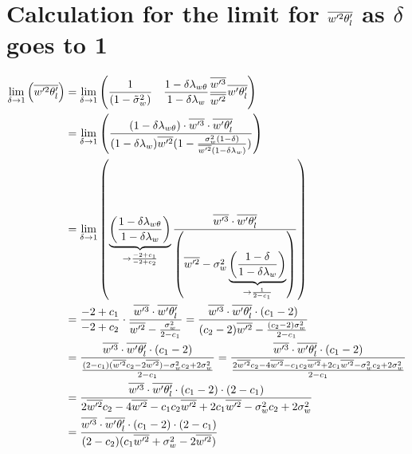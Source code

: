 \section{Calculation for the limit for \texorpdfstring{$\overline{w'^2 \theta_l'}$}{wprime2thetalprimebar} as \texorpdfstring{$\delta$}{delta} goes to 1}
\label{sec:calculation-for-the-limit-for-wprime2thetalprimebar-as-delta-goes-to-1}

\begin{align}
    \label{eq:limit_wprime2thetalbar_delta_to_1_calc}
    \lim_{\delta \to 1}\left(\overline{w'^2 \theta_l'}\right)
    &= \lim_{\delta \to 1}\left(
    \frac{1}{\left( 1 - \tilde{\sigma}_w^2 \right)}
    \quad
    \frac{1 - \delta \lambda_{w\theta}}{1-\delta \lambda_w}
    \frac{\overline{w'^3}}{\overline{w'^2}} \overline{w'\theta_l'}
    \right)
    \\
    &= \lim_{\delta \to 1}\left(
    \frac{(1 - \delta \lambda_{w\theta}) \cdot \overline{w'^3} \cdot \overline{w'\theta_l'}}
    {(1-\delta \lambda_w)\overline{w'^2} (1-\frac{\sigma_w^2 (1-\delta)}{\overline{w'^2} (1-\delta\lambda_w)})}
    \right)
    \\
    &= \lim_{\delta \to 1}\left(
    \underbrace{\left(\frac{1 - \delta \lambda_{w\theta}}{1 - \delta\lambda_w}\right)}_{\to \frac{-2 + c_1}{-2 + c_2}}
    \frac{\overline{w'^3} \cdot \overline{w'\theta_l'}}
    {\left(\overline{w'^2} - \sigma_w^2 \underbrace{\left(\frac{1-\delta}{1-\delta\lambda_w}\right)}_{\to \frac{1}{2 - c_1}}\right)}
    \right)
    \\
    &= \frac{-2 + c_1}{-2 + c_2} \cdot
    \frac{\overline{w'^3} \cdot \overline{w'\theta_l'}}
    {\overline{w'^2} - \frac{\sigma_w^2}{2 - c_1}}
    = \frac{\overline{w'^3} \cdot \overline{w'\theta_l'} \cdot (c_1 - 2)}
    {(c_2 - 2)\overline{w'^2} - \frac{(c_2 - 2)\sigma_w^2}{2 - c_1}} \\
    &= \frac{\overline{w'^3} \cdot \overline{w'\theta_l'} \cdot (c_1 - 2)}
    {\frac{(2 - c_1) (\overline{w'^2} c_2 - 2\overline{w'^2}) - \sigma_w^2 c_2 + 2\sigma_w^2}{2 - c_1}}
    = \frac{\overline{w'^3} \cdot \overline{w'\theta_l'} \cdot (c_1 - 2)}
    {\frac{2\overline{w'^2} c_2 - 4\overline{w'^2} - c_1 c_2 \overline{w'^2} + 2 c_1 \overline{w'^2} - \sigma_w^2 c_2 + 2\sigma_w^2}{2 - c_1}} \\
    &= \frac{\overline{w'^3} \cdot \overline{w'\theta_l'} \cdot (c_1 - 2) \cdot (2 - c_1)}
    {2\overline{w'^2} c_2 - 4\overline{w'^2} - c_1 c_2 \overline{w'^2} + 2 c_1 \overline{w'^2} - \sigma_w^2 c_2 + 2\sigma_w^2} \\
    &= \frac{\overline{w'^3} \cdot \overline{w'\theta_l'} \cdot (c_1 - 2) \cdot (2 - c_1)}
    {(2 - c_2) (c_1\overline{w'^2} + \sigma_w^2 - 2\overline{w'^2})}
\end{align}